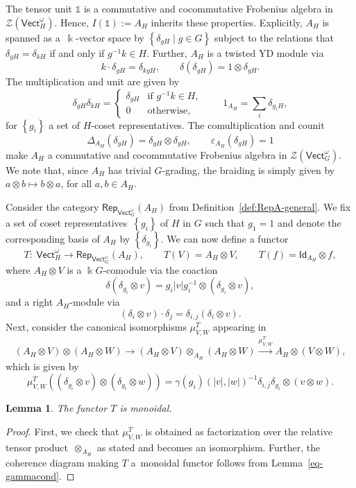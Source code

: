 \documentclass[pdftex]{sigma}
\numberwithin{equation}{section}
\newtheorem{Lemma}[Theorem]{Lemma}
\newcommand{\Set}[1]{\left\lbrace #1\right\rbrace}
\newcommand{\ide}{\mathsf{Id}}
\newcommand{\one}{\mathds{1}}
\newcommand{\Rep}{\mathsf{Rep}}
\newcommand{\Vect}{\mathsf{Vect}}
\newcommand{\cZ}{\mathcal{Z}}
\newcommand{\rI}{I}
\begin{document}
\begin{Example}\label{ex:AH}
The tensor unit $\one$ is a commutative and cocommutative Frobenius algebra in~$\cZ( \Vect_H^\omega)$. Hence, $\rI(\one):=A_H$ inherits these properties. Explicitly, $A_H$ is spanned as a~$\Bbbk$-vector space by $\Set{\delta_{gH}\mid g\in G }$ subject to the relations that $\delta_{gH}=\delta_{kH}$ if and only if $g^{-1}k\in H$. Further, $A_H$ is a twisted YD module via
\[
k\cdot \delta_{gH}=\delta_{kgH}, \qquad \delta(\delta_{gH})=1\otimes \delta_{gH}.
\]
The multiplication and unit are given by
\[\delta_{gH}\delta_{kH}=\begin{cases}\delta_{gH} & \text{if $g^{-1}k\in H$},\\ 0 & \text{otherwise},\end{cases}
\qquad 1_{A_H}=\sum_{i}\delta_{g_iH},\]
for $\Set{g_i}$ a set of $H$-coset representatives. The comultiplication and counit
\[\Delta_{A_H}(\delta_{gH})=\delta_{gH}\otimes \delta_{gH}, \qquad \varepsilon_{A_H}(\delta_{gH})=1\]
make $A_H$ a commutative and cocommutative Frobenius algebra in $\cZ( \Vect_G^\omega)$. We note that, since $A_H$ has trivial $G$-grading, the braiding is simply given by
$a\otimes b\mapsto b\otimes a$, for all $a,b\in A_H$.
\end{Example}


Consider the category $\Rep_{\Vect_G^\omega}(A_H)$ from Definition~\ref{def:RepA-general}. We fix a set of coset representatives~$\Set{g_i}$ of $H$ in $G$ such that $g_1=1$ and denote the corresponding basis of $A_H$ by $\Set{\delta_{g_i}}$. We can now define a functor
\[T\colon\ \Vect_H^\omega\to \Rep_{\Vect_G^\omega}(A_H), \qquad T(V)= A_H\otimes V,\qquad T(f)=\ide_{A_H}\otimes f,\]
where $A_H\otimes V$ is a $\Bbbk G$-comodule via the coaction
\[\delta(\delta_{g_i}\otimes v)=g_i|v|g_i^{-1}\otimes (\delta_{g_i}\otimes v),\]
and a right $A_H$-module via
\[(\delta_i\otimes v)\cdot \delta_j= \delta_{i,j}(\delta_i\otimes v).\]
Next, consider the canonical isomorphisms $\mu^T_{V,W}$ appearing in
\[(A_H\otimes V)\otimes (A_H\otimes W)\to (A_H\otimes V)\otimes_{A_H} (A_H\otimes W)\xrightarrow{\mu^T_{V,W}} A_H\otimes (V\otimes W),\]
which is given by
\[\mu^T_{V,W}((\delta_{g_i}\otimes v)\otimes (\delta_{g_i}\otimes w))=\gamma(g_i)(|v|,|w|)^{-1}\delta_{i,j}\delta_{g_i}\otimes (v\otimes w).\]
\begin{Lemma}\label{lem:T-monoidal}
 The functor $T$ is monoidal.
\end{Lemma}
\begin{proof}
First, we check that $\mu^T_{V,W}$ is obtained as factorization over the relative tensor product~$\otimes_{A_H}$ as stated and becomes an isomorphism. Further, the coherence diagram making $T$ a~monoidal functor follows from Lemma~\ref{eq-gammacond}.
\end{proof}
\end{document}
